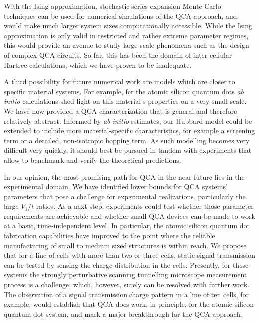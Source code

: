 With the Ising approximation, stochastic series expansion Monte Carlo techniques
can be used for numerical simulations of the QCA approach, and would make much
larger system sizes computationally accessible. While the Ising approximation is
only valid in restricted and rather extreme parameter regimes, this would
provide an avenue to study large-scale phenomena such as the design of
complex QCA circuits. So far, this has been the domain of inter-cellular Hartree
calculations, which we have proven to be inadequate.

A third possibility for future numerical work are models which are closer to
specific material systems. For example, for the atomic silicon quantum dots
\emph{ab initio} calculations shed light on this material's properties on a very
small scale. We have now provided a QCA characterization that is general and
therefore relatively abstract. Informed by \emph{ab initio} estimates, our
Hubbard model could be extended to include more material-specific
characteristics, for example a screening term or a detailed, non-isotropic
hopping term. As such modelling becomes very difficult very quickly, it should
best be pursued in tandem with experiments that allow to benchmark and verify
the theoretical predictions.

In our opinion, the most promising path for QCA in the near future lies in the
experimental domain. We have identified lower bounds for QCA systems' parameters
that pose a challenge for experimental realizations, particularly the large
$V_1/t$ ratios. As a next step, experiments could test whether those parameter
requirements are achievable and whether small QCA devices can be made to work at
a basic, time-independent level. In particular, the atomic silicon quantum dot
fabrication capabilities have improved to the point where the reliable
manufacturing of small to medium sized structures is within reach. We propose
that for a line of cells with more than two or three cells, static signal
transmission can be tested by sensing the charge distribution in the cells.
Presently, for these systems the strongly perturbative scanning tunnelling
microscope measurement process is a challenge, which, however, surely can be
resolved with further work. The observation of a signal transmission charge
pattern in a line of ten cells, for example, would establish that QCA does work,
in principle, for the atomic silicon quantum dot system, and mark a major
breakthrough for the QCA approach.


